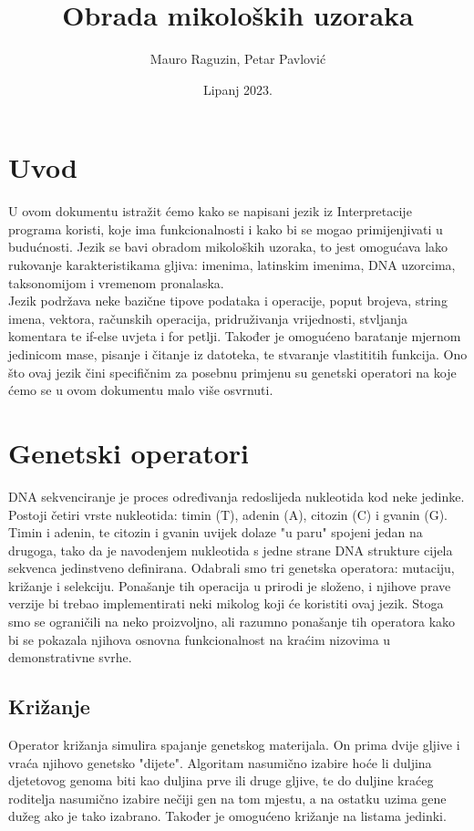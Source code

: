 \documentclass[12pt]{scrartcl}
\title{Obrada mikoloških uzoraka}
\author{Mauro Raguzin, Petar Pavlović}
\date{Lipanj 2023.}
\begin{document}
\maketitle

\section{Uvod}
U ovom dokumentu istražit ćemo kako se napisani jezik iz Interpretacije programa koristi, koje ima
funkcionalnosti i kako bi se mogao primijenjivati u budućnosti. Jezik se bavi obradom mikoloških uzoraka,
to jest omogućava lako rukovanje karakteristikama gljiva: imenima, latinskim imenima, DNA uzorcima,
taksonomijom i vremenom pronalaska.
\\Jezik podržava neke bazične tipove podataka i operacije, poput brojeva, string imena, vektora,
računskih operacija, pridruživanja vrijednosti, stvljanja komentara te if-else uvjeta i for petlji.
Također je omogućeno baratanje mjernom jedinicom mase, pisanje i čitanje iz datoteka, te stvaranje
vlastititih funkcija.
Ono što ovaj jezik čini specifičnim za posebnu primjenu su genetski operatori na koje ćemo se u ovom
dokumentu malo više osvrnuti. 

\section{Genetski operatori}
DNA sekvenciranje je proces određivanja redoslijeda nukleotida kod neke jedinke. Postoji četiri vrste
nukleotida: timin (T), adenin (A), citozin (C) i gvanin (G). Timin i adenin, te citozin i gvanin uvijek
dolaze "u paru" spojeni jedan na drugoga, tako da je navodenjem nukleotida s jedne strane DNA strukture
cijela sekvenca jedinstveno definirana. Odabrali smo tri genetska operatora: mutaciju, križanje i
selekciju. Ponašanje tih operacija u prirodi je složeno, i njihove prave verzije bi trebao implementirati
neki mikolog koji će koristiti ovaj jezik. Stoga smo se ograničili na neko proizvoljno, ali razumno
ponašanje tih operatora kako bi se pokazala njihova osnovna funkcionalnost na kraćim nizovima u
demonstrativne svrhe.
\subsection{Križanje}
Operator križanja simulira spajanje genetskog materijala. On prima dvije gljive i vraća njihovo genetsko
"dijete". Algoritam nasumično izabire hoće li duljina djetetovog genoma biti kao duljina prve ili druge
gljive, te do duljine kraćeg roditelja nasumično izabire nečiji gen na tom mjestu, a na ostatku uzima gene
dužeg ako je tako izabrano. Također je omogućeno križanje na listama jedinki.
\end{document}
